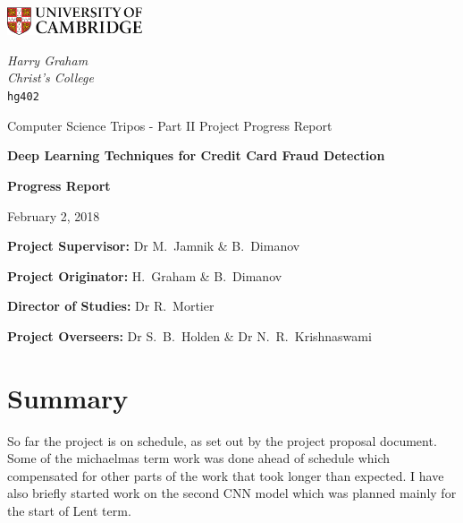 \documentclass[12pt,a4paper,twoside]{article}
\begin{document}
\begin{titlepage}
	\noindent
	\begin{minipage}[t][][t]{0.5\textwidth}
		\includegraphics[width=40mm]{CamLogo.jpg}
	\end{minipage}
	\begin{minipage}{0.5\textwidth}
	\begin{flushright}
		\large
		\textit{Harry Graham}
		\\
		\textit{Christ's College}
		\\
		\texttt{hg402}
	\end{flushright}
	\end{minipage}
	
	\begin{center}
	\vspace{6cm}
	{\sc\large Computer Science Tripos - Part II Project Progress Report \par}
	\vspace{0.5cm}
	{\huge\bf Deep Learning Techniques for Credit Card Fraud Detection\par}
	\vspace{0.5cm}
	{\huge\bf Progress Report\par}
	\vspace{0.5cm}
	{\large February 2, 2018 \par}
	\end{center}
	
	\vfill
	
	\begin{flushleft}
		\textbf{Project Supervisor:} Dr M.~Jamnik \& B.~Dimanov
		
		\textbf{Project Originator:}  H.~Graham \& B.~Dimanov

		\textbf{Director of Studies:}  Dr R.~Mortier

		\textbf{Project Overseers:} Dr S.~B.~Holden  \& Dr N.~R.~Krishnaswami
	\end{flushleft}
	
	\vspace{1.5cm}
\end{titlepage}

\section*{Summary}
So far the project is on schedule, as set out by the project proposal document. Some of the michaelmas term work was done ahead of schedule which compensated for other parts of the work that took longer than expected. I have also briefly started work on the second CNN model which was planned mainly for the start of Lent term. 
\end{document}
